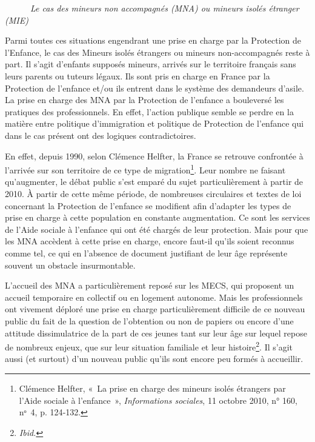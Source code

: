 \documentclass[
  12,
  a4paper,
]{report}
\begin{document}
~~~~~~\emph{Le cas des mineurs non accompagnés (MNA) ou mineurs isolés
étranger (MIE)}

Parmi toutes ces situations engendrant une prise en charge par la
Protection de l'Enfance, le cas des Mineurs isolés étrangers ou mineurs
non-accompagnés reste à part. Il s'agit d'enfants supposés mineurs,
arrivés sur le territoire français sans leurs parents ou tuteurs légaux.
Ils sont pris en charge en France par la Protection de l'enfance et/ou
ils entrent dans le système des demandeurs d'asile. La prise en charge
des MNA par la Protection de l'enfance a bouleversé les pratiques des
professionnels. En effet, l'action publique semble se perdre en la
matière entre politique d'immigration et politique de Protection de
l'enfance qui dans le cas présent ont des logiques contradictoires.

En effet, depuis 1990, selon Clémence Helfter, la France se retrouve
confrontée à l'arrivée sur son territoire de ce type de
migration\footnote{Clémence Helfter, {«~La prise en charge des mineurs
  isolés étrangers par l'Aide sociale à l'enfance~»}, \emph{Informations
  sociales}, 11 octobre 2010, n° 160, nᵒ~4, p. 124‑132.}. Leur nombre ne
faisant qu'augmenter, le débat public s'est emparé du sujet
particulièrement à partir de 2010. À partir de cette même période, de
nombreuses circulaires et textes de loi concernant la Protection de
l'enfance se modifient afin d'adapter les types de prise en charge à
cette population en constante augmentation. Ce sont les services de
l'Aide sociale à l'enfance qui ont été chargés de leur protection. Mais
pour que les MNA accèdent à cette prise en charge, encore faut-il qu'ils
soient reconnus comme tel, ce qui en l'absence de document justifiant de
leur âge représente souvent un obstacle insurmontable.

L'accueil des MNA a particulièrement reposé sur les MECS, qui proposent
un accueil temporaire en collectif ou en logement autonome. Mais les
professionnels ont vivement déploré une prise en charge particulièrement
difficile de ce nouveau public du fait de la question de l'obtention ou
non de papiers ou encore d'une attitude dissimulatrice de la part de ces
jeunes tant sur leur âge sur lequel repose de nombreux enjeux, que sur
leur situation familiale et leur histoire\footnote{\emph{Ibid.}}. Il
s'agit aussi (et surtout) d'un nouveau public qu'ils sont encore peu
formés à accueillir.
\end{document}
